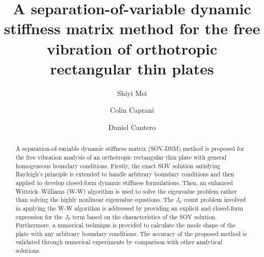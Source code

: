\documentclass[preprint,12pt,number]{elsarticle}
\begin{document}
\onehalfspacing  %
\begin{frontmatter}
\title{A separation-of-variable dynamic stiffness matrix method for the free vibration of orthotropic rectangular thin plates}
\author[1]{Shiyi Mei}
\author[1]{Colin Caprani}
\author[2]{Daniel Cantero}
\begin{abstract}
	A separation-of-variable dynamic stiffness matrix (SOV-DSM) method is proposed for the free vibration analysis of an orthotropic rectangular thin plate with general homogeneous boundary conditions.  
	Firstly, the exact SOV solution satisfying Rayleigh’s principle is extended to handle arbitrary boundary conditions and then applied to develop closed-form dynamic stiffness formulations.
	Then, an enhanced Wittrick–Williams (W-W) algorithm is used to solve the eigenvalue problem rather than solving the highly nonlinear eigenvalue equations.
	The $J_0$ count problem involved in applying the W-W algorithm is addressed by providing an explicit and closed-form expression for the $J_0$ term based on the characteristics of the SOV solution.
	Furthermore, a numerical technique is provided to calculate the mode shape of the plate with any arbitrary boundary conditions.
	The accuracy of the proposed method is validated through numerical experiments by comparison with other analytical solutions.
\end{abstract}
\end{frontmatter}
\linenumbers
\end{document}
